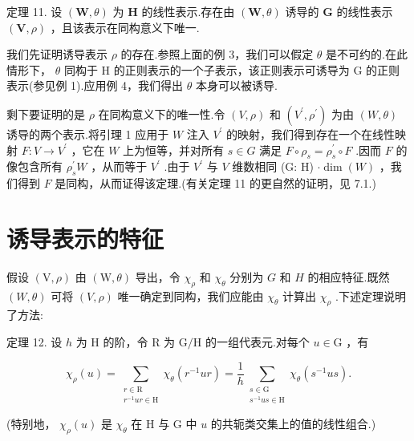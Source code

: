 \documentclass[10pt]{article}
\begin{document}
定理 11. 设 \(\left( {\mathbf{W},\theta }\right)\) 为 \(\mathbf{H}\) 的线性表示.存在由 \(\left( {\mathbf{W},\theta }\right)\) 诱导的 \(\mathbf{G}\) 的线性表示 \(\left( {\mathbf{V},\rho }\right)\) ，且该表示在同构意义下唯一.

我们先证明诱导表示 \(\rho\) 的存在.参照上面的例 3，我们可以假定 \(\theta\) 是不可约的.在此情形下， \(\theta\) 同构于 H 的正则表示的一个子表示，该正则表示可诱导为 G 的正则表示(参见例 1).应用例 4，我们得出 \(\theta\) 本身可以被诱导.

剩下要证明的是 \(\rho\) 在同构意义下的唯一性.令 \(\left( {V,\rho }\right)\) 和 \(\left( {{V}^{\prime },{\rho }^{\prime }}\right)\) 为由 \(\left( {W,\theta }\right)\) 诱导的两个表示.将引理 1 应用于 \(W\) 注入 \({V}^{\prime }\) 的映射，我们得到存在一个在线性映射 \(F : V \rightarrow  {V}^{\prime }\) ，它在 \(W\) 上为恒等，并对所有 \(s \in  G\) 满足 \(F \circ  {\rho }_{s} = {\rho }_{s}^{\prime } \circ  F\) .因而 \(F\) 的像包含所有 \({\rho }_{s}^{\prime }W\) ，从而等于 \({V}^{\prime }\) .由于 \({V}^{\prime }\) 与 \(V\) 维数相同 (G: H) \(\cdot  \dim \left( W\right)\) ，我们得到 \(F\) 是同构，从而证得该定理.(有关定理 11 的更自然的证明，见 7.1.)

\section*{诱导表示的特征}

假设 \(\left( {\mathrm{V},\rho }\right)\) 由 \(\left( {\mathrm{W},\theta }\right)\) 导出，令 \({\chi }_{\rho }\) 和 \({\chi }_{\theta }\) 分别为 \(G\) 和 \(H\) 的相应特征.既然 \(\left( {W,\theta }\right)\) 可将 \(\left( {V,\rho }\right)\) 唯一确定到同构，我们应能由 \({\chi }_{\theta }\) 计算出 \({\chi }_{\rho }\) .下述定理说明了方法:

定理 12. 设 \(h\) 为 \(\mathrm{H}\) 的阶，令 \(\mathrm{R}\) 为 \(\mathrm{G}/\mathrm{H}\) 的一组代表元.对每个 \(u \in  \mathrm{G}\) ，有

\[
{\chi }_{\rho }\left( u\right)  = \mathop{\sum }\limits_{\substack{{r \in  \mathrm{R}} \\  {{r}^{-1}{ur} \in  \mathrm{H}} }}{\chi }_{\theta }\left( {{r}^{-1}{ur}}\right)  = \frac{1}{h}\mathop{\sum }\limits_{\substack{{s \in  \mathrm{G}} \\  {{s}^{-1}{us} \in  \mathrm{H}} }}{\chi }_{\theta }\left( {{s}^{-1}{us}}\right) .
\]

(特别地， \({\chi }_{\rho }\left( u\right)\) 是 \({\chi }_{\theta }\) 在 \(\mathrm{H}\) 与 G 中 \(u\) 的共轭类交集上的值的线性组合.)
\end{document}
